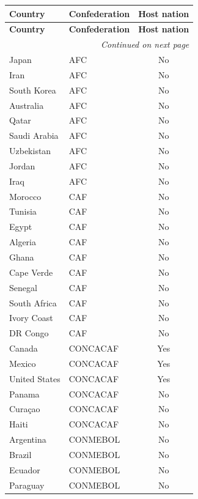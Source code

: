 \documentclass[12pt]{article}
\begin{document}
\begin{longtable}{llc}
\toprule
\textbf{Country} & \textbf{Confederation} & \textbf{Host nation} \\
\midrule
\endfirsthead
\toprule
\textbf{Country} & \textbf{Confederation} & \textbf{Host nation} \\
\midrule
\endhead
\midrule
\multicolumn{3}{r}{\textit{Continued on next page}} \\
\endfoot
\bottomrule
\endlastfoot
Japan          & AFC & No \\
Iran           & AFC & No \\
South Korea    & AFC & No \\
Australia      & AFC & No \\
Qatar          & AFC & No \\
Saudi Arabia   & AFC & No \\
Uzbekistan     & AFC & No \\
Jordan         & AFC & No \\
Iraq           & AFC & No \\
Morocco        & CAF & No \\
Tunisia        & CAF & No \\
Egypt          & CAF & No \\
Algeria        & CAF & No \\
Ghana          & CAF & No \\
Cape Verde     & CAF & No \\
Senegal        & CAF & No \\
South Africa   & CAF & No \\
Ivory Coast    & CAF & No \\
DR Congo       & CAF & No \\
Canada         & CONCACAF & Yes \\
Mexico         & CONCACAF & Yes \\
United States  & CONCACAF & Yes \\
Panama         & CONCACAF & No \\
Cura\c{c}ao   & CONCACAF & No \\
Haiti          & CONCACAF & No \\
Argentina      & CONMEBOL & No \\
Brazil         & CONMEBOL & No \\
Ecuador        & CONMEBOL & No \\
Paraguay       & CONMEBOL & No \\

\end{longtable}
\end{document}
